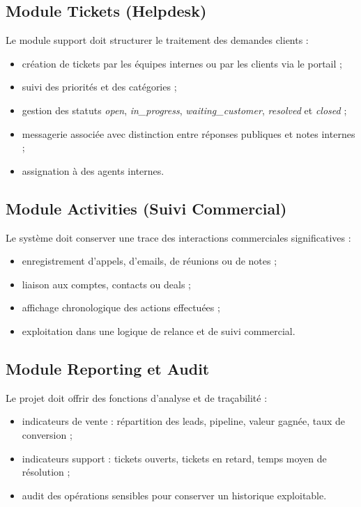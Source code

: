 \subsection{Module Tickets (Helpdesk)}
Le module support doit structurer le traitement des demandes clients :
\begin{itemize}
    \item création de tickets par les équipes internes ou par les clients via le portail ;
    \item suivi des priorités et des catégories ;
    \item gestion des statuts \textit{open}, \textit{in\_progress}, \textit{waiting\_customer}, \textit{resolved} et \textit{closed} ;
    \item messagerie associée avec distinction entre réponses publiques et notes internes ;
    \item assignation à des agents internes.
\end{itemize}

\subsection{Module Activities (Suivi Commercial)}
Le système doit conserver une trace des interactions commerciales significatives :
\begin{itemize}
    \item enregistrement d'appels, d'emails, de réunions ou de notes ;
    \item liaison aux comptes, contacts ou deals ;
    \item affichage chronologique des actions effectuées ;
    \item exploitation dans une logique de relance et de suivi commercial.
\end{itemize}

\subsection{Module Reporting et Audit}
Le projet doit offrir des fonctions d'analyse et de traçabilité :
\begin{itemize}
    \item indicateurs de vente : répartition des leads, pipeline, valeur gagnée, taux de conversion ;
    \item indicateurs support : tickets ouverts, tickets en retard, temps moyen de résolution ;
    \item audit des opérations sensibles pour conserver un historique exploitable.
\end{itemize}

